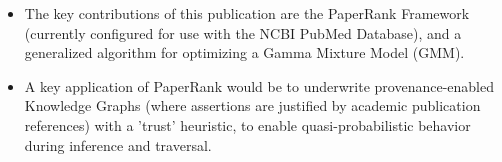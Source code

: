 \documentclass[10pt, letterpaper]{article}
\newcommand{\tabularxwidth}{\textwidth}
\begin{document}
\begin{minipage}{\tabularxwidth}
\begin{itemize}[noitemsep, topsep=3pt, parsep=0pt, partopsep=0pt]
                \item 
    The key contributions of this publication are the PaperRank Framework (currently configured for use with the NCBI PubMed Database), and a generalized algorithm for optimizing a Gamma Mixture Model (GMM).
            
                \item 
    A key application of PaperRank would be to underwrite provenance-enabled Knowledge Graphs (where assertions are justified by academic publication references) with a 'trust' heuristic, to enable quasi-probabilistic behavior during inference and traversal.
            
        \end{itemize}

        
            \vspace{.5em}
        

        \end{minipage}
    
\end{document}
